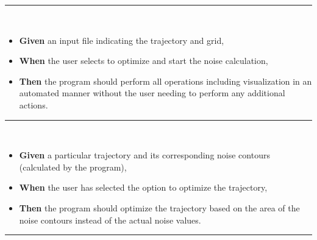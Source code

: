 \noindent\rule{8cm}{0.4pt} \\
\begin{itemize}
\item \textbf{Given} an input file indicating the trajectory and grid,
\item \textbf{When} the user selects to optimize and start the noise calculation,
\item \textbf{Then} the program should perform all operations including visualization in an automated manner without the user needing to perform any additional actions.\\
\end{itemize}
\noindent\rule{8cm}{0.4pt} \\
\begin{itemize}
\item \textbf{Given} a particular trajectory and its corresponding noise contours (calculated by the program),
\item \textbf{When} the user has selected the option to optimize the trajectory,
\item \textbf{Then} the program should optimize the trajectory based on the area of the noise contours instead of the actual noise values.
\end{itemize}
\noindent\rule{8cm}{0.4pt} \\

